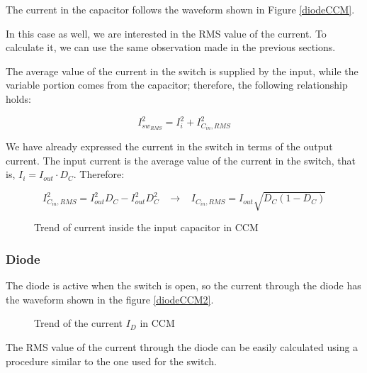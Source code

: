 \documentclass[../main.tex]{subfiles}
\begin{document}
The current in the capacitor follows the waveform shown in Figure \autoref{diodeCCM}.

In this case as well, we are interested in the RMS value of the current. To calculate it, we can use the same observation made in the previous sections.

The average value of the current in the switch is supplied by the input, while the variable portion comes from the capacitor; therefore, the following relationship holds:

\begin{equation}
	I^2_{sw_{RMS}} = I^2_i + I^2_{C_{in},RMS}
\end{equation}

We have already expressed the current in the switch in terms of the output current. The input current is the average value of the current in the switch, that is, $I_i = I_{out} \cdot D_C$. 
Therefore:

\begin{equation}
	I^2_{C_{in},RMS} = I^2_{out} D_C -  I^2_{out} D^2_C \hspace{10pt} \longrightarrow \hspace{10pt} I_{C_{in}, RMS} = I_{out} \sqrt{D_C(1-D_C)}
\end{equation}

\begin{figure}[h!]
\begin{center}


\label{diodeCCM}
\caption{Trend of current inside the input capacitor in CCM}	
\end{center}
\end{figure}

\subsubsection*{Diode}

The diode is active when the switch is open, so the current through the diode has the waveform shown in the figure \autoref{diodeCCM2}.


\begin{figure}[h!]
\begin{center}


\label{diodeCCM2}
\caption{Trend of the current $I_D$ in CCM}	
\end{center}
\end{figure}

The RMS value of the current through the diode can be easily calculated using a procedure similar to the one used for the switch. 
\end{document}
